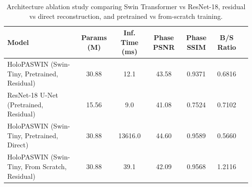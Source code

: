 \begin{table}[h]
\centering
\caption{Architecture ablation study comparing Swin Transformer vs ResNet-18, residual vs direct reconstruction, and pretrained vs from-scratch training.}
\label{tab:architecture_ablation}
\scriptsize
\begin{tabular}{@{}lcccccc@{}}
\toprule
\textbf{Model} & \textbf{Params (M)} & \textbf{Inf. Time (ms)} & \textbf{Phase PSNR} & \textbf{Phase SSIM} & \textbf{B/S Ratio} \\ \midrule
HoloPASWIN (Swin-Tiny, Pretrained, Residual) & 30.88 & 12.1 & 43.58 & 0.9371 & 0.6816 \\
ResNet-18 U-Net (Pretrained, Residual) & 15.56 & 9.0 & 41.08 & 0.7524 & 0.7102 \\
HoloPASWIN (Swin-Tiny, Pretrained, Direct) & 30.88 & 13616.0 & 44.60 & 0.9589 & 0.5660 \\
HoloPASWIN (Swin-Tiny, From Scratch, Residual) & 30.88 & 39.1 & 42.09 & 0.9568 & 1.2116 \\
\bottomrule
\end{tabular}
\end{table}
